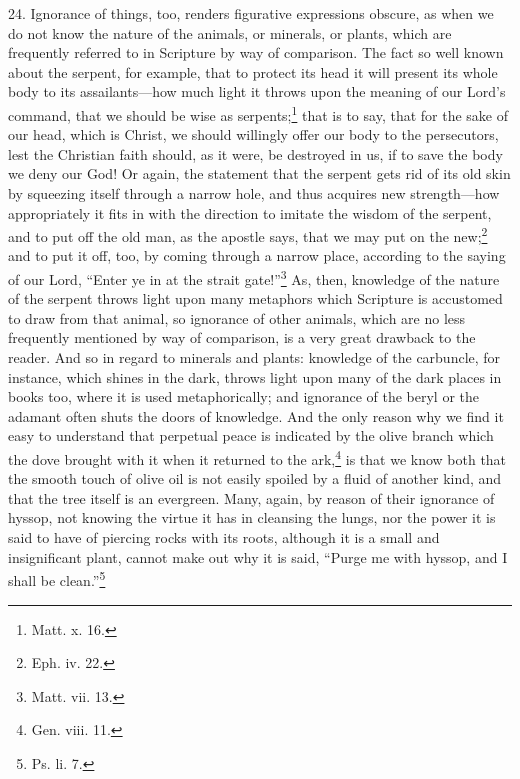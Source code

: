 24. Ignorance of things, too, renders figurative expressions obscure, as when we do not know the nature of the animals, or minerals, or plants, which are frequently referred to in Scripture by way of comparison. The fact so well known about the serpent, for example, that to protect its head it will present its whole body to its assailants—how much light it throws upon the meaning of our Lord’s command, that we should be wise as serpents;\footnote{Matt. x. 16.} that is to say, that for the sake of our head, which is Christ, we should willingly offer our body to the persecutors, lest the Christian faith should, as it were, be destroyed in us, if to save the body we deny our God! Or again, the statement that the serpent gets rid of its old skin by squeezing itself through a narrow hole, and thus acquires new strength—how appropriately it fits in with the direction to imitate the wisdom of the serpent, and to put off the old man, as the apostle says, that we may put on the new;\footnote{Eph. iv. 22.} and to put it off, too, by coming through a narrow place, according to the saying of our Lord, “Enter ye in at the strait gate!”\footnote{Matt. vii. 13.} As, then, knowledge of the nature of the serpent throws light upon many metaphors which Scripture is accustomed to draw from that animal, so ignorance of other animals, which are no less frequently mentioned by way of comparison, is a very great drawback to the reader. And so in regard to minerals and plants: knowledge of the carbuncle, for instance, which shines in the dark, throws light upon many of the dark places in books too, where it is used metaphorically; and ignorance of the beryl or the adamant often shuts the doors of knowledge. And the only reason why we find it easy to understand that perpetual peace is indicated by the olive branch which the dove brought with it when it returned to the ark,\footnote{Gen. viii. 11.} is that we know both that the smooth touch of olive oil is not easily spoiled by a fluid of another kind, and that the tree itself is an evergreen. Many, again, by reason of their ignorance of hyssop, not knowing the virtue it has in cleansing the lungs, nor the power it is said to have of piercing rocks with its roots, although it is a small and insignificant plant, cannot make out why it is said, “Purge me with hyssop, and I shall be clean.”\footnote{Ps. li. 7.}

